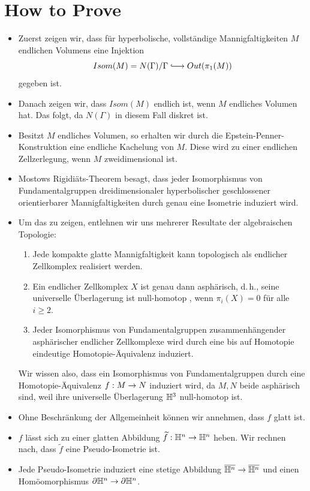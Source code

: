 \documentclass{book}
\begin{document}
\section{How to Prove}
\begin{itemize}
	\item Zuerst zeigen wir, dass für hyperbolische, vollständige Mannigfaltigkeiten $M$ endlichen Volumens eine Injektion
	\[ Isom(M) = N(\Gamma) / \Gamma \Inj{} Out(\pi_1(M)) \]
	gegeben ist.
	\item Danach zeigen wir, dass $Isom(M)$ endlich ist, wenn $M$ endliches Volumen hat. Das folgt, da $N(\Gamma)$ in diesem Fall diskret ist.
	\item Besitzt $M$ endliches Volumen, so erhalten wir durch die Epstein-Penner-Konstruktion eine endliche Kachelung von $M$. Diese wird zu einer endlichen Zellzerlegung, wenn $M$ zweidimensional ist.
	\item Mostows Rigidiäts-Theorem besagt, dass jeder Isomorphismus von Fundamentalgruppen dreidimensionaler hyperbolischer geschlossener orientierbarer Mannigfaltigkeiten durch genau eine Isometrie induziert wird.
	\item Um das zu zeigen, entlehnen wir uns mehrerer Resultate der algebraischen Topologie:
	\begin{enumerate}[1.)]
		\item Jede kompakte glatte Mannigfaltigkeit kann topologisch als endlicher Zellkomplex realisiert werden.
		\item Ein endlicher Zellkomplex $X$ ist genau dann asphärisch, d.\,h., seine universelle Überlagerung ist null-homotop , wenn $\pi_i(X) = 0$ für alle $i\geq 2$.
		\item Jeder Isomorphismus von Fundamentalgruppen zusammenhängender asphärischer endlicher Zellkomplexe wird durch eine bis auf Homotopie eindeutige Homotopie-Äquivalenz induziert.
	\end{enumerate}
Wir wissen also, dass ein Isomorphismus von Fundamentalgruppen durch eine Homotopie-Äquivalenz $f : M \overset{}{\rightarrow} N$ induziert wird, da $M,N$ beide asphärisch sind, weil ihre universelle Überlagerung $\mathbb{H}^3$ null-homotop ist.
\item Ohne Beschränkung der Allgemeinheit können wir annehmen, dass $f$ glatt ist.
\item $f$ lässt sich zu einer glatten Abbildung $\widetilde{f} : \mathbb{H}^n \overset{}{\rightarrow} \mathbb{H}^n$ heben. Wir rechnen nach, dass $\widetilde{f}$ eine Pseudo-Isometrie ist.
\item Jede Pseudo-Isometrie induziert eine stetige Abbildung $\overline{\mathbb{H}^n} \overset{}{\rightarrow} \overline{\mathbb{H}^n}$ und einen Homöomorphismus $\partial \mathbb{H}^n \overset{}{\rightarrow} \partial \mathbb{H}^n$.

\end{itemize}
\end{document}
